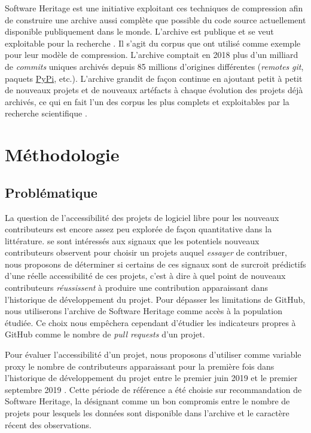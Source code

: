 \documentclass[dvipsnames,runningheads]{llncs}
\newcommand{\en}[1]{\foreignlanguage{english}{\emph{#1}}}
\begin{document}
    Software Heritage est une initiative exploitant ces techniques de compression afin de construire une
    archive aussi complète que possible du code source actuellement disponible publiquement dans le monde.
    L'archive est publique et se veut exploitable pour la recherche \parencite{swh-2017}. Il s'agit du corpus
    que \textcite{swh-graph-2020} ont utilisé comme exemple pour leur modèle de compression. L'archive
    comptait en 2018 plus d'un milliard de \en{commits} uniques archivés depuis 85 millions d'origines
    différentes (\en{remotes} \en{git}, paquets \href{https://pypi.org/}{PyPi}, etc.). L'archive grandit de
    façon continue en ajoutant petit à petit de nouveaux projets et de nouveaux artéfacts à chaque évolution
    des projets déjà archivés, ce qui en fait l'un des corpus les plus complets et exploitables par la
    recherche scientifique \parencite{swh-2019,swh-growth-2019}.

    \section{Méthodologie}

    \subsection{Problématique}

    La question de l'accessibilité des projets de logiciel libre pour les nouveaux contributeurs est encore
    assez peu explorée de façon quantitative dans la littérature. \textcite{signals-2019} se sont intéressés
    aux signaux que les potentiels nouveaux contributeurs observent pour choisir un projets auquel
    \emph{essayer} de contribuer, nous proposons de déterminer si certains de ces signaux sont de surcroit
    prédictifs d'une réelle accessibilité de ces projets, c'est à dire à quel point de nouveaux contributeurs
    \emph{réussissent} à produire une contribution apparaissant dans l'historique de développement du projet.
    Pour dépasser les limitations de GitHub, nous utiliserons l'archive de Software Heritage comme accès à la
    population étudiée. Ce choix nous empêchera cependant d'étudier les indicateurs propres à GitHub comme le
    nombre de \en{pull requests} d'un projet.

    Pour évaluer l'accessibilité d'un projet, nous proposons d'utiliser comme variable proxy le nombre de
    contributeurs apparaissant pour la première fois dans l'historique de développement du projet entre le
    premier juin 2019 et le premier septembre 2019 \parencite[voir section \ref{sec:accessibility-measure},
    ainsi que][p.~13,16]{signals-2019}. Cette période de référence a été choisie sur recommandation de
    Software Heritage, la désignant comme un bon compromis entre le nombre de projets pour lesquels les
    données sont disponible dans l'archive et le caractère récent des observations.
\end{document}
